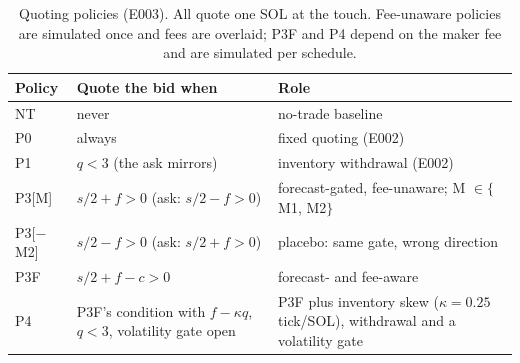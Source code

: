 \documentclass[11pt]{article}
\begin{document}
\begin{table}[t]
  \centering\small
  \caption{Quoting policies (E003). All quote one SOL at the touch. Fee-unaware policies are simulated once and fees
  are overlaid; P3F and P4 depend on the maker fee and are simulated per schedule.}
  \label{tab:policies}
  \begin{tabularx}{\linewidth}{l L L}
    \toprule
    Policy & Quote the bid when & Role \\
    \midrule
    NT & never & no-trade baseline \\
    P0 & always & fixed quoting (E002) \\
    P1 & $q<3$ (the ask mirrors) & inventory withdrawal (E002) \\
    P3[M] & $s/2 + f > 0$ (ask: $s/2 - f > 0$) & forecast-gated, fee-unaware; M $\in\{$M1, M2$\}$ \\
    P3[$-$M2] & $s/2 - f > 0$ (ask: $s/2 + f > 0$) & placebo: same gate, wrong direction \\
    P3F & $s/2 + f - c > 0$ & forecast- and fee-aware \\
    P4 & P3F's condition with $f-\kappa q$, $q<3$, volatility gate open & P3F plus inventory skew ($\kappa=0.25$ tick/SOL), withdrawal and a volatility gate \\
    \bottomrule
  \end{tabularx}
\end{table}
\end{document}
